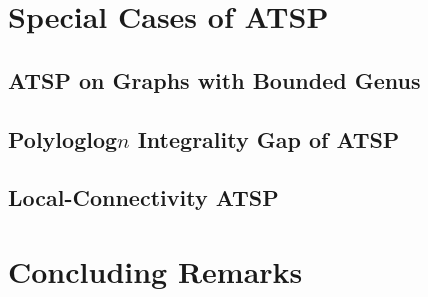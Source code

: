 \documentclass[oneside]{projectpaper} %
\begin{document}
\section{Special Cases of ATSP}

\subsection{ATSP on Graphs with Bounded Genus}

\subsection{Polyloglog$n$ Integrality Gap of ATSP}

\subsection{Local-Connectivity ATSP}

\section{Concluding Remarks}


\nocite{*}


\end{document}
